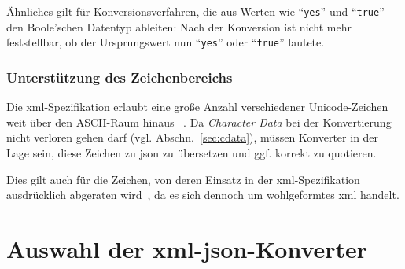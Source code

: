 Ähnliches gilt für Konversionsverfahren, die aus Werten wie \enquote{\texttt{yes}} und \enquote{\texttt{true}} den Boole'schen Datentyp ableiten: Nach der Konversion ist nicht mehr feststellbar, ob der Ursprungswert nun \enquote{\texttt{yes}} oder \enquote{\texttt{true}} lautete.

\subsubsection{Unterstützung des Zeichenbereichs}

Die \acrshort{xml}-Spezifikation erlaubt eine große Anzahl verschiedener Unicode-Zeichen weit über den ASCII-Raum hinaus ~\cite[Regel~2]{xml}. Da \emph{Character Data} bei der Konvertierung nicht verloren gehen darf (vgl. Abschn.~\ref{sec:cdata}), müssen Konverter in der Lage sein, diese Zeichen zu \acrshort{json} zu übersetzen und ggf. korrekt zu quotieren.

Dies gilt auch für die Zeichen, von deren Einsatz in der \acrshort{xml}-Spezifikation ausdrücklich abgeraten wird~\cite[Abschn.~2.2]{xml}, da es sich dennoch um wohlgeformtes \acrshort{xml} handelt.

\section{Auswahl der \acrshort{xml}-\acrshort{json}-Konverter}
\label{sec:converters}

